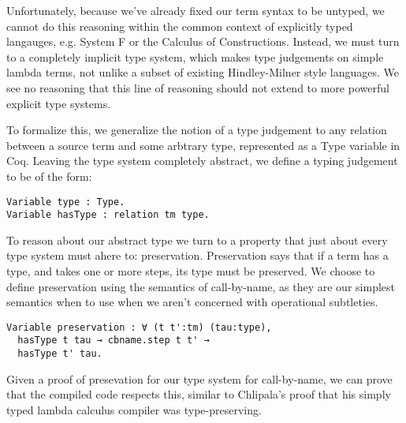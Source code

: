 Unfortunately, because we've already fixed our term syntax to be untyped, we
cannot do this reasoning within the common context of explicitly typed
langauges, e.g. System F or the Calculus of Constructions. Instead, we must turn
to a completely implicit type system, which makes type judgements on simple
lambda terms, not unlike a subset of existing Hindley-Milner style languages. We
see no reasoning that this line of reasoning should not extend to more powerful
explicit type systems. 

To formalize this, we generalize the notion of a type judgement to any relation
between a source term and some arbtrary type, represented as a Type variable in
Coq. Leaving the type system completely abstract, we define a typing judgement
to be of the form:

\begin{lstlisting}
Variable type : Type.
Variable hasType : relation tm type.
\end{lstlisting}

To reason about our abstract type we turn to a property that just about every
type system must ahere to: preservation. Preservation says that if a term has a
type, and takes one or more steps, its type must be preserved. We choose to
define preservation using the semantics of call-by-name, as they are our
simplest semantics when to use when we aren't concerned with operational
subtleties.

\begin{lstlisting}
Variable preservation : ∀ (t t':tm) (tau:type), 
  hasType t tau → cbname.step t t' →
  hasType t' tau.
\end{lstlisting}

Given a proof of presevation for our type system for call-by-name, we can prove
that the compiled code respects this, similar to Chlipala's proof that his
simply typed lambda calculus compiler was type-preserving.


                                                
